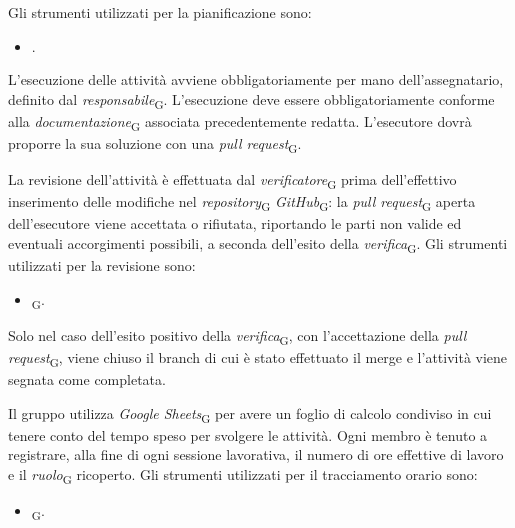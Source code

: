 Gli strumenti utilizzati per la pianificazione sono:
    \begin{itemize}
        \item {}.
    \end{itemize}

L'esecuzione delle attività avviene obbligatoriamente per mano dell'assegnatario, definito dal \textit{responsabile}\textsubscript{G}. L'esecuzione deve essere obbligatoriamente conforme alla \textit{documentazione}\textsubscript{G} associata precedentemente redatta. L'esecutore dovrà proporre la sua soluzione con una \textit{pull request}\textsubscript{G}.

La revisione dell'attività è effettuata dal \textit{verificatore}\textsubscript{G} prima dell'effettivo inserimento delle modifiche nel \textit{repository}\textsubscript{G} \textit{GitHub}\textsubscript{G}: la \textit{pull request}\textsubscript{G} aperta dell'esecutore viene accettata o rifiutata, riportando le parti non valide ed eventuali accorgimenti possibili, a seconda dell'esito della \textit{verifica}\textsubscript{G}.
Gli strumenti utilizzati per la revisione sono:
    \begin{itemize}
        \item \textit{}\textsubscript{G}.
    \end{itemize}

Solo nel caso dell'esito positivo della \textit{verifica}\textsubscript{G}, con l'accettazione della \textit{pull request}\textsubscript{G}, viene chiuso il branch di cui è stato effettuato il merge e l'attività viene segnata come completata. 

Il gruppo utilizza \textit{Google Sheets}\textsubscript{G} per avere un foglio di calcolo condiviso in cui tenere conto del tempo speso per svolgere le attività. Ogni membro è tenuto a registrare, alla fine di ogni sessione lavorativa, il numero di ore effettive di lavoro e il \textit{ruolo}\textsubscript{G} ricoperto.
Gli strumenti utilizzati per il tracciamento orario sono:
    \begin{itemize}
        \item \textit{}\textsubscript{G}.
    \end{itemize}


